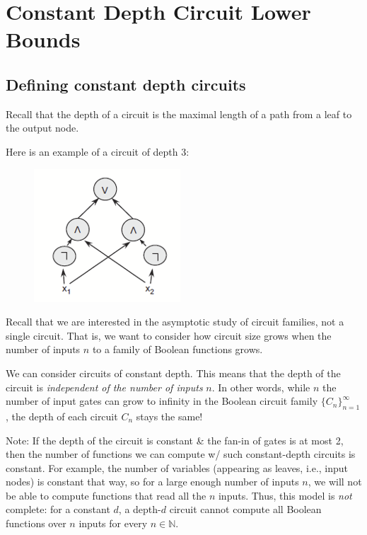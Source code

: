 %
%  
%
%










\chapter{Constant Depth Circuit Lower Bounds}
\label{hastad} %

\section{Defining constant depth circuits}
Recall that the depth of a circuit is the maximal length of a path from a leaf to the output node.

Here is an example of a circuit of depth 3:
\begin{figure}
    \centering
    \includegraphics[width=0.25\linewidth]{images/depth_3_circuit.png}
    \label{fig:enter-label}
\end{figure}

Recall that we are interested in the asymptotic study of circuit families, not a single circuit. That is, we want to consider how circuit size grows when the number of inputs $n$ to a family of Boolean functions grows.

We can consider circuits of constant depth. This means that the depth of the circuit is \emph{independent of the number of inputs} $n$. In other words,  while $n$ the number of input gates can grow to infinity in the Boolean circuit family $\{C_n\}_{n=1}^\infty$, the depth of each circuit $C_n$ stays the same!


Note: If the depth of the circuit is constant \& the fan-in of gates is at most 2, then the number of functions we can compute w/ such constant-depth circuits is constant. For example, the number of variables (appearing as leaves, i.e., input nodes) is constant that way, so for a large enough number of inputs $n$, we will not be able to compute functions that read all the $n$ inputs.  
Thus, this model is \emph{not} complete: for a constant $d$, a depth-$d$ circuit cannot compute all Boolean functions over $n$ inputs for every $n \in \mathbb{N}$.

